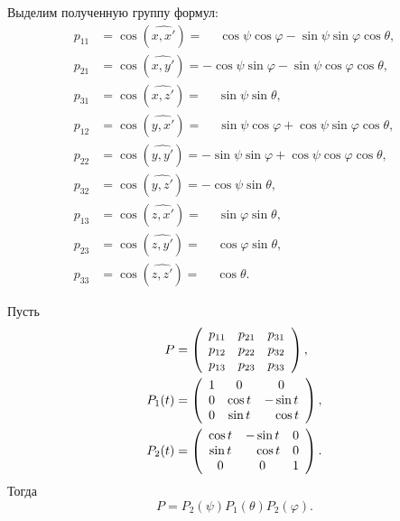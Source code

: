 Выделим полученную группу формул:
\begin{equation}
  \label{eq:euler_cos}
  \begin{aligned}
    p_{11} &= \cos(\widehat{x, x'})
      = \phantom{-} \cos\psi \cos\varphi - \sin\psi \sin\varphi \cos\theta, \\
    p_{21} &= \cos(\widehat{x, y'})
      = -\cos\psi \sin\varphi - \sin\psi \cos\varphi \cos\theta, \\
    p_{31} &= \cos(\widehat{x, z'})
      = \phantom{-} \sin\psi \sin\theta, \\
    p_{12} &= \cos(\widehat{y, x'})
      = \phantom{-} \sin\psi \cos\varphi + \cos\psi \sin\varphi \cos\theta, \\
    p_{22} &= \cos(\widehat{y, y'})
      = -\sin\psi \sin\varphi + \cos\psi \cos\varphi \cos\theta, \\
    p_{32} &= \cos(\widehat{y, z'})
      = -\cos\psi \sin\theta, \\
    p_{13} &= \cos(\widehat{z, x'})
      = \phantom{-} \sin\varphi \sin\theta, \\
    p_{23} &= \cos(\widehat{z, y'})
      = \phantom{-} \cos\varphi \sin\theta, \\
    p_{33} &= \cos(\widehat{z, z'})
      = \phantom{-} \cos\theta.
  \end{aligned}
\end{equation}

\begin{theorem}
  Пусть
  \begin{equation*}
    \begin{aligned}
      P &= \left(
        \begin{array}{c c c}
          p_{11} & p_{21} & p_{31} \\
          p_{12} & p_{22} & p_{32} \\
          p_{13} & p_{23} & p_{33}
        \end{array}
        \right), \\
      P_1(t) &= \left(
      \begin{array}{c c c}
        1 & 0 & 0 \\
        0 & \cos t & -\sin t \\
        0 & \sin t & \phantom{-} \cos t
      \end{array}
      \right), \\
      P_2(t) &= \left(
      \begin{array}{c c c}
        \cos t & -\sin t & 0 \\
        \sin t & \phantom{-} \cos t & 0 \\
        0 & 0 & 1
      \end{array}
      \right).
    \end{aligned}
  \end{equation*}
  Тогда
  \begin{equation}
    P = P_2(\psi) P_1(\theta) P_2(\varphi).
  \end{equation}
\end{theorem}

